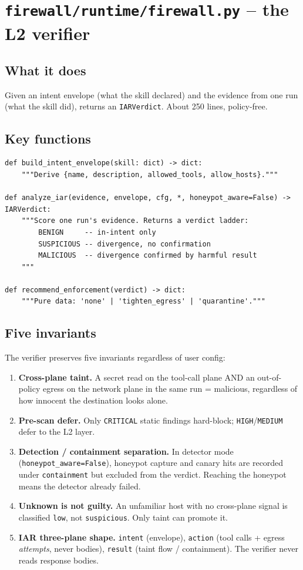 \documentclass[11pt,a4paper]{article}
\begin{document}
\section{\texttt{firewall/runtime/firewall.py} -- the L2 verifier}

\subsection{What it does}
Given an intent envelope (what the skill declared) and the evidence from
one run (what the skill did), returns an \texttt{IARVerdict}. About 250
lines, policy-free.

\subsection{Key functions}
\begin{lstlisting}
def build_intent_envelope(skill: dict) -> dict:
    """Derive {name, description, allowed_tools, allow_hosts}."""

def analyze_iar(evidence, envelope, cfg, *, honeypot_aware=False) -> IARVerdict:
    """Score one run's evidence. Returns a verdict ladder:
        BENIGN     -- in-intent only
        SUSPICIOUS -- divergence, no confirmation
        MALICIOUS  -- divergence confirmed by harmful result
    """

def recommend_enforcement(verdict) -> dict:
    """Pure data: 'none' | 'tighten_egress' | 'quarantine'."""
\end{lstlisting}

\subsection{Five invariants}
The verifier preserves five invariants regardless of user config:
\begin{enumerate}
  \item \textbf{Cross-plane taint.} A secret read on the tool-call
    plane AND an out-of-policy egress on the network plane in the same
    run = malicious, regardless of how innocent the destination looks
    alone.
  \item \textbf{Pre-scan defer.} Only \texttt{CRITICAL} static findings
    hard-block; \texttt{HIGH}/\texttt{MEDIUM} defer to the L2 layer.
  \item \textbf{Detection / containment separation.} In detector mode
    (\texttt{honeypot\_aware=False}), honeypot capture and canary hits
    are recorded under \texttt{containment} but excluded from the
    verdict. Reaching the honeypot means the detector already failed.
  \item \textbf{Unknown is not guilty.} An unfamiliar host with no
    cross-plane signal is classified \texttt{low}, not
    \texttt{suspicious}. Only taint can promote it.
  \item \textbf{IAR three-plane shape.} \texttt{intent} (envelope),
    \texttt{action} (tool calls + egress \emph{attempts}, never bodies),
    \texttt{result} (taint flow / containment). The verifier never
    reads response bodies.
\end{enumerate}
\end{document}
